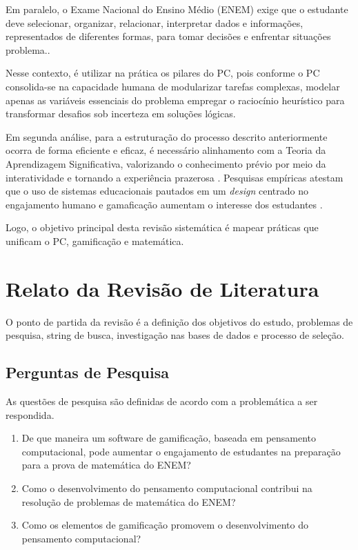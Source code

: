 \documentclass[12pt]{article}
\begin{document}
Em paralelo, o Exame Nacional do Ensino Médio (ENEM) exige que o estudante deve selecionar, organizar, relacionar, interpretar dados e informações, representados de diferentes formas, para tomar decisões e enfrentar situações problema.\cite{matriz_enem}. 

Nesse contexto, é utilizar na prática os pilares do PC, pois conforme \cite{wing2006} o PC consolida-se na capacidade humana de modularizar tarefas complexas, modelar apenas as variáveis essenciais do problema empregar o raciocínio heurístico para transformar desafios sob incerteza em soluções lógicas.

Em segunda análise, para a estruturação do processo descrito anteriormente ocorra de forma eficiente e eficaz, é necessário alinhamento com a Teoria da Aprendizagem Significativa, valorizando o conhecimento prévio por meio da interatividade e tornando a experiência prazerosa \cite{rolim2023rabbit}. Pesquisas empíricas atestam que o uso de sistemas educacionais pautados em um \textit{design} centrado no engajamento humano e gamaficação aumentam o interesse dos estudantes \cite{atin2022}.

Logo, o objetivo principal desta revisão sistemática é mapear práticas que unificam o PC, gamificação e matemática. 

\section{Relato da Revisão de Literatura}

O ponto de partida da revisão é a definição dos objetivos do estudo, problemas de pesquisa, string de busca, investigação nas bases de dados e processo de seleção. 
\subsection{Perguntas de Pesquisa}

As questões de pesquisa são definidas de acordo com a problemática a ser respondida.

\begin{enumerate}
    \item De que maneira um software de gamificação, baseada em pensamento computacional, pode aumentar o engajamento de estudantes na preparação para a prova de matemática do ENEM?
    \item Como o desenvolvimento do pensamento computacional contribui na resolução de problemas de matemática do ENEM?
    \item Como os elementos de gamificação promovem o desenvolvimento do pensamento computacional?
\end{enumerate}
\end{document}

